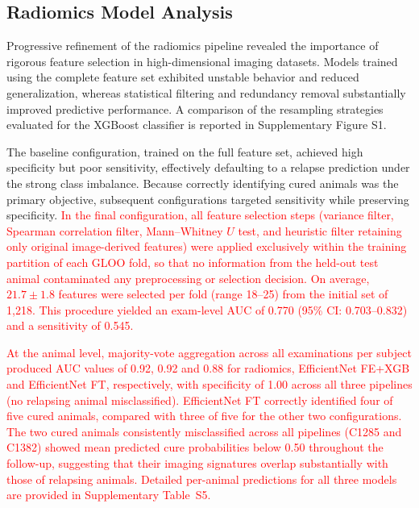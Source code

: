 \documentclass{article}
\begin{document}
\subsection{Radiomics Model Analysis}

Progressive refinement of the radiomics pipeline revealed the importance of rigorous feature selection in high-dimensional imaging datasets. Models trained using the complete feature set exhibited unstable behavior and reduced generalization, whereas statistical filtering and redundancy removal substantially improved predictive performance. A comparison of the resampling strategies evaluated for the XGBoost classifier is reported in Supplementary Figure S1.

The baseline configuration, trained on the full feature set, achieved high specificity but poor sensitivity, effectively defaulting to a relapse prediction under the strong class imbalance. Because correctly identifying cured animals was the primary objective, subsequent configurations targeted sensitivity while preserving specificity. \textcolor{red}{In the final configuration, all feature selection steps (variance filter, Spearman correlation filter, Mann--Whitney $U$ test, and heuristic filter retaining only original image-derived features) were applied exclusively within the training partition of each GLOO fold, so that no information from the held-out test animal contaminated any preprocessing or selection decision. On average, $21.7 \pm 1.8$ features were selected per fold (range 18--25) from the initial set of 1,218. This procedure yielded an exam-level AUC of 0.770 (95\% CI: 0.703--0.832) and a sensitivity of 0.545.}

\textcolor{red}{At the animal level, majority-vote aggregation across all examinations per subject produced AUC values of 0.92, 0.92 and 0.88 for radiomics, EfficientNet FE+XGB and EfficientNet FT, respectively, with specificity of 1.00 across all three pipelines (no relapsing animal misclassified). EfficientNet FT correctly identified four of five cured animals, compared with three of five for the other two configurations. The two cured animals consistently misclassified across all pipelines (C1285 and C1382) showed mean predicted cure probabilities below 0.50 throughout the follow-up, suggesting that their imaging signatures overlap substantially with those of relapsing animals. Detailed per-animal predictions for all three models are provided in Supplementary Table~S5.}
\end{document}
